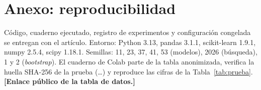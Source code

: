 \documentclass[conference,letterpaper]{IEEEtran}
\newcommand{\pendiente}[1]{\textcolor{udrojo}{\textbf{[#1]}}}
\begin{document}









\section*{Anexo: reproducibilidad}
{\footnotesize Código, cuaderno ejecutado, registro de experimentos y configuración congelada se entregan con el artículo. Entorno: Python 3.13, pandas 3.1.1, scikit-learn 1.9.1, numpy 2.5.4, scipy 1.18.1. Semillas: 11, 23, 37, 41, 53 (modelos), 2026 (búsqueda), 1 y 2 (\emph{bootstrap}). El cuaderno de Colab parte de la tabla anonimizada, verifica la huella SHA-256 de la prueba (\texttt{\cifHuella}\ldots) y reproduce las cifras de la Tabla~\ref{tab:prueba}. \pendiente{Enlace público de la tabla de datos.}\par}


\end{document}
